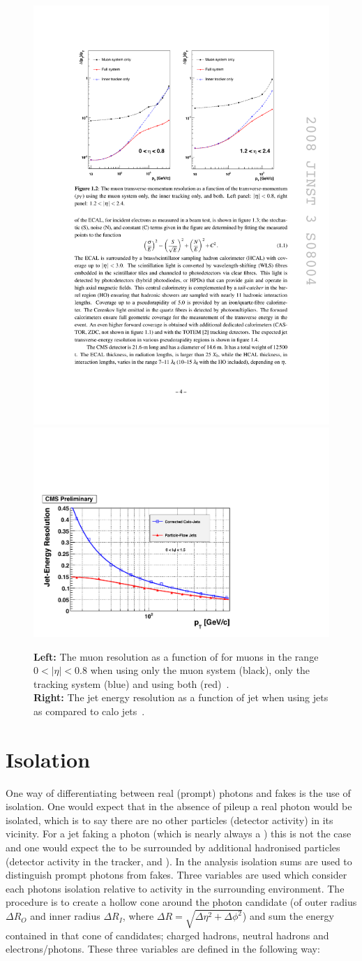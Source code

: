 \begin{figure}
  \includegraphics[height=0.4\textwidth]{cms_experiment/plots/MuonResolution.pdf}
  \includegraphics[height=0.4\textwidth]{cms_experiment/plots/BarrelResolutionPFAndCalo.pdf}
  \caption[Particle flow jet resolution]{\textbf{Left:} The muon \pT resolution as a function of \pT for muons in the range $0<|\eta|<0.8$ when using only the muon system (black), only the tracking system (blue) and using both (red)~\cite{CMS_JINST}. \\ \textbf{Right:} The jet energy resolution as a function of jet \pT when using \PF jets as compared to calo jets~\cite{cms_pf_performance}.}
  \label{fig:muon_jet_res}
\end{figure}

\section{Isolation}
\label{sec:iso}

One way of differentiating between real (prompt) photons and fakes is the use of isolation. One would expect that in the absence of pileup a real photon would be isolated, which is to say there are no other particles (detector activity) in its vicinity. For a jet faking a photon (which is nearly always a \pizero) this is not the case and one would expect the \pizero to be surrounded by additional hadronised particles (detector activity in the tracker, \ECAL and \HCAL). In the \CMS \Hgg analysis isolation sums are used to distinguish prompt photons from fakes. Three variables are used which consider each photons isolation relative to activity in the surrounding environment. The procedure is to create a hollow cone around the photon candidate (of outer radius $\Delta R_{O}$ and inner radius $\Delta R_{I}$, where $\Delta R = \sqrt{\Delta\eta^{2}+\Delta\phi^{2}}$) and sum the energy contained in that cone of \PF candidates; charged hadrons, neutral hadrons and electrons/photons. These three variables are defined in the following way:

